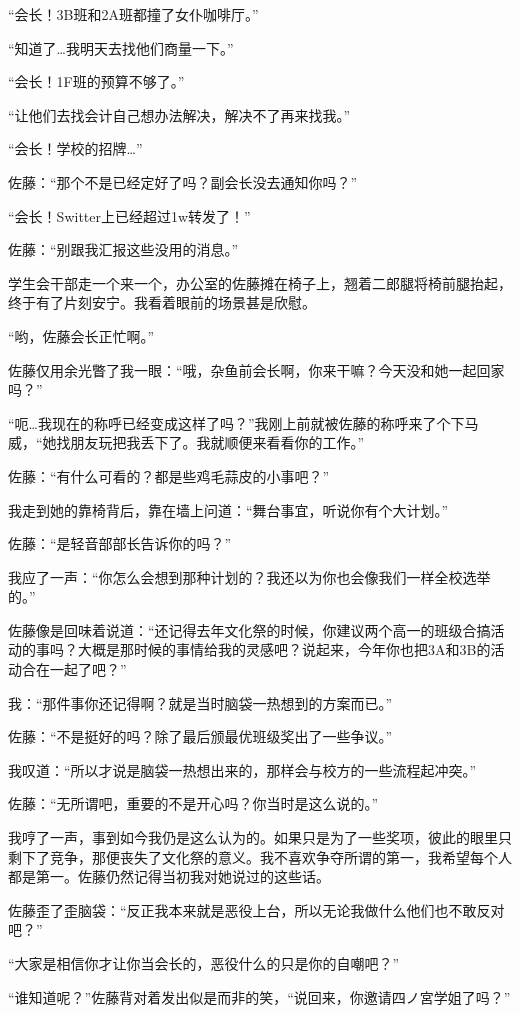 “会长！3B班和2A班都撞了女仆咖啡厅。”

“知道了…我明天去找他们商量一下。”

“会长！1F班的预算不够了。”

“让他们去找会计自己想办法解决，解决不了再来找我。”

“会长！学校的招牌…”

佐藤：“那个不是已经定好了吗？副会长没去通知你吗？”

“会长！Switter上已经超过1w转发了！”

佐藤：“别跟我汇报这些没用的消息。”

学生会干部走一个来一个，办公室的佐藤摊在椅子上，翘着二郎腿将椅前腿抬起，终于有了片刻安宁。我看着眼前的场景甚是欣慰。

“哟，佐藤会长正忙啊。”

佐藤仅用余光瞥了我一眼：“哦，杂鱼前会长啊，你来干嘛？今天没和她一起回家吗？”

“呃…我现在的称呼已经变成这样了吗？”我刚上前就被佐藤的称呼来了个下马威，“她找朋友玩把我丢下了。我就顺便来看看你的工作。”

佐藤：“有什么可看的？都是些鸡毛蒜皮的小事吧？”

我走到她的靠椅背后，靠在墙上问道：“舞台事宜，听说你有个大计划。”

佐藤：“是轻音部部长告诉你的吗？”

我应了一声：“你怎么会想到那种计划的？我还以为你也会像我们一样全校选举的。”

佐藤像是回味着说道：“还记得去年文化祭的时候，你建议两个高一的班级合搞活动的事吗？大概是那时候的事情给我的灵感吧？说起来，今年你也把3A和3B的活动合在一起了吧？”

我：“那件事你还记得啊？就是当时脑袋一热想到的方案而已。”

佐藤：“不是挺好的吗？除了最后颁最优班级奖出了一些争议。”

我叹道：“所以才说是脑袋一热想出来的，那样会与校方的一些流程起冲突。”

佐藤：“无所谓吧，重要的不是开心吗？你当时是这么说的。”

我哼了一声，事到如今我仍是这么认为的。如果只是为了一些奖项，彼此的眼里只剩下了竞争，那便丧失了文化祭的意义。我不喜欢争夺所谓的第一，我希望每个人都是第一。佐藤仍然记得当初我对她说过的这些话。

佐藤歪了歪脑袋：“反正我本来就是恶役上台，所以无论我做什么他们也不敢反对吧？”

“大家是相信你才让你当会长的，恶役什么的只是你的自嘲吧？”

“谁知道呢？”佐藤背对着发出似是而非的笑，“说回来，你邀请四ノ宮学姐了吗？”


